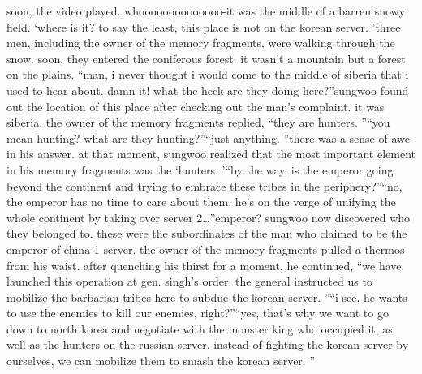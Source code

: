 soon, the video played.
whoooooooooooooo-it was the middle of a barren snowy field.
‘where is it? to say the least, this place is not on the korean server.
’three men, including the owner of the memory fragments, were walking through the snow.
soon, they entered the coniferous forest.
 it wasn’t a mountain but a forest on the plains.
“man, i never thought i would come to the middle of siberia that i used to hear about.
 damn it! what the heck are they doing here?”sungwoo found out the location of this place after checking out the man’s complaint.
it was siberia.
the owner of the memory fragments replied, “they are hunters.
”“you mean hunting? what are they hunting?”“just anything.
”there was a sense of awe in his answer.
at that moment, sungwoo realized that the most important element in his memory fragments was the ‘hunters.
’“by the way, is the emperor going beyond the continent and trying to embrace these tribes in the periphery?”“no, the emperor has no time to care about them.
 he’s on the verge of unifying the whole continent by taking over server 2…”emperor? sungwoo now discovered who they belonged to.
 these were the subordinates of the man who claimed to be the emperor of china-1 server.
the owner of the memory fragments pulled a thermos from his waist.
 after quenching his thirst for a moment, he continued, “we have launched this operation at gen.
 singh’s order.
 the general instructed us to mobilize the barbarian tribes here to subdue the korean server.
”“i see.
 he wants to use the enemies to kill our enemies, right?”“yes, that’s why we want to go down to north korea and negotiate with the monster king who occupied it, as well as the hunters on the russian server.
 instead of fighting the korean server by ourselves, we can mobilize them to smash the korean server.
”

 
